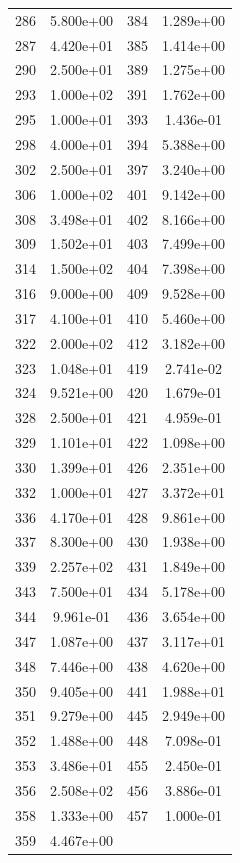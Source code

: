 \documentclass[12pt]{article}
\begin{document}
\begin{longtable}{@{}cccc@{}}
286 & 5.800e+00 & 384 & 1.289e+00 \\
287 & 4.420e+01 & 385 & 1.414e+00 \\
290 & 2.500e+01 & 389 & 1.275e+00 \\
293 & 1.000e+02 & 391 & 1.762e+00 \\
295 & 1.000e+01 & 393 & 1.436e-01 \\
298 & 4.000e+01 & 394 & 5.388e+00 \\
302 & 2.500e+01 & 397 & 3.240e+00 \\
306 & 1.000e+02 & 401 & 9.142e+00 \\
308 & 3.498e+01 & 402 & 8.166e+00 \\
309 & 1.502e+01 & 403 & 7.499e+00 \\
314 & 1.500e+02 & 404 & 7.398e+00 \\
316 & 9.000e+00 & 409 & 9.528e+00 \\
317 & 4.100e+01 & 410 & 5.460e+00 \\
322 & 2.000e+02 & 412 & 3.182e+00 \\
323 & 1.048e+01 & 419 & 2.741e-02 \\
324 & 9.521e+00 & 420 & 1.679e-01 \\
328 & 2.500e+01 & 421 & 4.959e-01 \\
329 & 1.101e+01 & 422 & 1.098e+00 \\
330 & 1.399e+01 & 426 & 2.351e+00 \\
332 & 1.000e+01 & 427 & 3.372e+01 \\
336 & 4.170e+01 & 428 & 9.861e+00 \\
337 & 8.300e+00 & 430 & 1.938e+00 \\
339 & 2.257e+02 & 431 & 1.849e+00 \\
343 & 7.500e+01 & 434 & 5.178e+00 \\
344 & 9.961e-01 & 436 & 3.654e+00 \\
347 & 1.087e+00 & 437 & 3.117e+01 \\
348 & 7.446e+00 & 438 & 4.620e+00 \\
350 & 9.405e+00 & 441 & 1.988e+01 \\
351 & 9.279e+00 & 445 & 2.949e+00 \\
352 & 1.488e+00 & 448 & 7.098e-01 \\
353 & 3.486e+01 & 455 & 2.450e-01 \\
356 & 2.508e+02 & 456 & 3.886e-01 \\
358 & 1.333e+00 & 457 & 1.000e-01 \\
359 & 4.467e+00 &  &  \\

\end{longtable}
\end{document}
